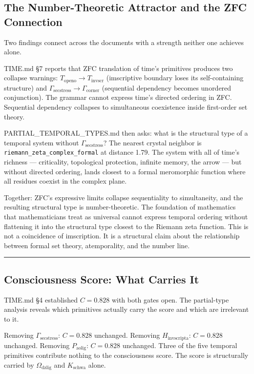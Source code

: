 \documentclass[12pt,a4paper]{article}
\newcommand{\pilcrow}{\S}
\begin{document}
\subsection{The Number-Theoretic Attractor and the ZFC Connection}

Two findings connect across the documents with a strength neither one achieves alone.

TIME.md \pilcrow{}7 reports that ZFC translation of time's primitives produces two collapse warnings: $T_{\text{openo}} \to T_{\text{invscr}}$ (imscriptive boundary loses its self-containing structure) and $\Gamma_{\text{secstress}} \to \Gamma_{\text{corner}}$ (sequential dependency becomes unordered conjunction). The grammar cannot express time's directed ordering in ZFC. Sequential dependency collapses to simultaneous coexistence inside first-order set theory.

PARTIAL\_TEMPORAL\_TYPES.md then asks: what is the structural type of a temporal system without $\Gamma_{\text{secstress}}$? The nearest crystal neighbor is \texttt{riemann\_zeta\_complex\_formal} at distance 1.79. The system with all of time's richness --- criticality, topological protection, infinite memory, the arrow --- but without directed ordering, lands closest to a formal meromorphic function where all residues coexist in the complex plane.

Together: ZFC's expressive limits collapse sequentiality to simultaneity, and the resulting structural type is number-theoretic. The foundation of mathematics that mathematicians treat as universal cannot express temporal ordering without flattening it into the structural type closest to the Riemann zeta function. This is not a coincidence of imscription. It is a structural claim about the relationship between formal set theory, atemporality, and the number line.

\begin{center}
\rule{0.5\textwidth}{0.4pt}
\end{center}

\subsection{Consciousness Score: What Carries It}

TIME.md \pilcrow{}4 established $C = 0.828$ with both gates open. The partial-type analysis reveals which primitives actually carry the score and which are irrelevant to it.

Removing $\Gamma_{\text{secstress}}$: $C = 0.828$ unchanged. Removing $H_{\text{invscripta}}$: $C = 0.828$ unchanged. Removing $P_{\text{aolig}}$: $C = 0.828$ unchanged. Three of the five temporal primitives contribute nothing to the consciousness score. The score is structurally carried by $\Omega_{\text{dzlig}}$ and $K_{\text{schwa}}$ alone.
\end{document}
